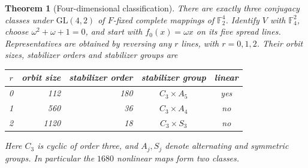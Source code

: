 \documentclass[11pt]{article}
\newtheorem{theorem}{Theorem}[section]
\begin{document}
\begin{theorem}[Four-dimensional classification]\label{thm:fixed-n4-conjugacy}
There are exactly three conjugacy classes under $\mathrm{GL}(4,2)$ of $F$-fixed
complete mappings of $\mathbb F_2^4$. Identify $V$ with $\mathbb F_4^2$, choose
$\omega^2+\omega+1=0$, and start with $f_0(x)=\omega x$ on its five spread lines.
Representatives are obtained by reversing any $r$ lines, with $r=0,1,2$.
Their orbit sizes, stabilizer orders and stabilizer groups are
\begin{center}
\begin{tabular}{c|r|r|c|c}
$r$ & orbit size & stabilizer order & stabilizer group & linear\\
\hline
0 & 112 & 180 & $C_3\times A_5$ & yes\\
1 & 560 & 36 & $C_3\times A_4$ & no\\
2 & 1120 & 18 & $C_3\times S_3$ & no
\end{tabular}
\end{center}
Here $C_3$ is cyclic of order three, and $A_j,S_j$ denote alternating and
symmetric groups. In particular the $1680$ nonlinear maps form two classes.
\end{theorem}
\end{document}
